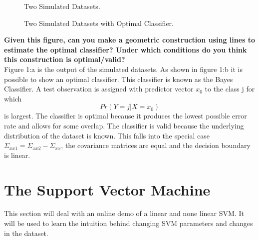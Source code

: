 \documentclass[11pt,oneside,a4paper]{article}
\begin{document}
\begin{figure}[H]
{	}%
	\fi
	\noindent
	\parbox{.45\textwidth}{%
		\centering
		\caption{Two Simulated Datasets.}
	}%
	\hfil
	\parbox{.45\textwidth}{%
		\centering
		\caption{Two Simulated Datasets with Optimal Classifier.}
	}%
\end{figure}




\textbf{Given this figure, can you make a geometric construction using lines to estimate the optimal classifier? Under which conditions do you think this construction is optimal/valid?}\\

Figure 1:a is the output of the simulated datasets. As shown in figure 1:b it is possible to show an optimal classifier. This classifier is known as the Bayes Classifier. A test observation is assigned with predictor vector $x_{0}$ to the class j for which    \[ Pr(Y=j|X=x_{0}) \] is largest. The classifier is optimal because it produces the lowest possible error rate and allows for some overlap. The classifier is valid because the underlying distribution of the dataset is known. This falls into the special case $\Sigma_{xx1} = \Sigma_{xx2} - \Sigma_{xx}$, the covariance matrices are equal and the decision boundary is linear.
\section{The Support Vector Machine}

This section will deal with an online demo of a linear and none linear SVM. It will be used to learn the intuition behind changing SVM parameters and changes in the dataset.\\
\end{document}
